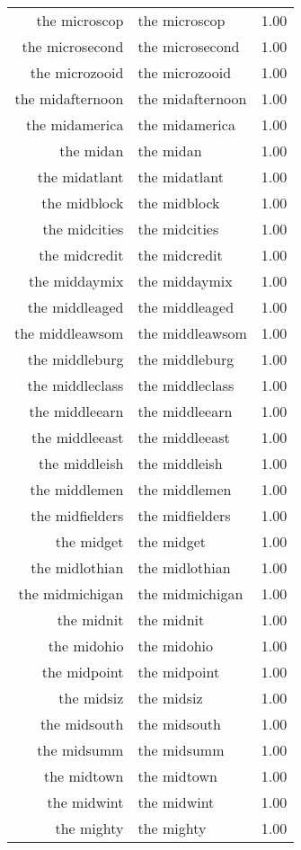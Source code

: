 \begin{table}[ht]
\begin{tabular}{rlr}
  the microscop & the microscop & 1.00 \\ 
  the microsecond & the microsecond & 1.00 \\ 
  the microzooid & the microzooid & 1.00 \\ 
  the midafternoon & the midafternoon & 1.00 \\ 
  the midamerica & the midamerica & 1.00 \\ 
  the midan & the midan & 1.00 \\ 
  the midatlant & the midatlant & 1.00 \\ 
  the midblock & the midblock & 1.00 \\ 
  the midcities & the midcities & 1.00 \\ 
  the midcredit & the midcredit & 1.00 \\ 
  the middaymix & the middaymix & 1.00 \\ 
  the middleaged & the middleaged & 1.00 \\ 
  the middleawsom & the middleawsom & 1.00 \\ 
  the middleburg & the middleburg & 1.00 \\ 
  the middleclass & the middleclass & 1.00 \\ 
  the middleearn & the middleearn & 1.00 \\ 
  the middleeast & the middleeast & 1.00 \\ 
  the middleish & the middleish & 1.00 \\ 
  the middlemen & the middlemen & 1.00 \\ 
  the midfielders & the midfielders & 1.00 \\ 
  the midget & the midget & 1.00 \\ 
  the midlothian & the midlothian & 1.00 \\ 
  the midmichigan & the midmichigan & 1.00 \\ 
  the midnit & the midnit & 1.00 \\ 
  the midohio & the midohio & 1.00 \\ 
  the midpoint & the midpoint & 1.00 \\ 
  the midsiz & the midsiz & 1.00 \\ 
  the midsouth & the midsouth & 1.00 \\ 
  the midsumm & the midsumm & 1.00 \\ 
  the midtown & the midtown & 1.00 \\ 
  the midwint & the midwint & 1.00 \\ 
  the mighty & the mighty & 1.00 \\ 

\end{tabular}
\end{table}

